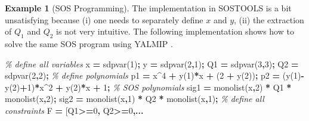 \documentclass[
]{book}
\newenvironment{Shaded}{\begin{snugshade}}{\end{snugshade}}
\newcommand{\CommentTok}[1]{\textcolor[rgb]{0.56,0.35,0.01}{\textit{#1}}}
\newcommand{\FloatTok}[1]{\textcolor[rgb]{0.00,0.00,0.81}{#1}}
\newcommand{\NormalTok}[1]{#1}
\newcommand{\OperatorTok}[1]{\textcolor[rgb]{0.81,0.36,0.00}{\textbf{#1}}}
\newcommand{\VariableTok}[1]{\textcolor[rgb]{0.00,0.00,0.00}{#1}}
\theoremstyle{definition}
\theoremstyle{definition}
\newtheorem{example}{Example}[chapter]
\theoremstyle{definition}
\theoremstyle{definition}
\theoremstyle{remark}
\begin{document}
\begin{example}[SOS Programming]
The implementation in SOSTOOLS is a bit unsatisfying because (i) one needs to separately define \(x\) and \(y\), (ii) the extraction of \(Q_1\) and \(Q_2\) is not very intuitive. The following implementation shows how to solve the same SOS program using YALMIP \citep{lofberg04icra-yalmip}.

\begin{Shaded}
\begin{Highlighting}[]
\CommentTok{\% define all variables}
\VariableTok{x} \OperatorTok{=} \VariableTok{sdpvar}\NormalTok{(}\FloatTok{1}\NormalTok{)}\OperatorTok{;}
\VariableTok{y} \OperatorTok{=} \VariableTok{sdpvar}\NormalTok{(}\FloatTok{2}\OperatorTok{,}\FloatTok{1}\NormalTok{)}\OperatorTok{;}
\VariableTok{Q1} \OperatorTok{=} \VariableTok{sdpvar}\NormalTok{(}\FloatTok{3}\OperatorTok{,}\FloatTok{3}\NormalTok{)}\OperatorTok{;}
\VariableTok{Q2} \OperatorTok{=} \VariableTok{sdpvar}\NormalTok{(}\FloatTok{2}\OperatorTok{,}\FloatTok{2}\NormalTok{)}\OperatorTok{;}
\CommentTok{\% define polynomials}
\VariableTok{p1} \OperatorTok{=} \VariableTok{x}\OperatorTok{\^{}}\FloatTok{4} \OperatorTok{+} \VariableTok{y}\NormalTok{(}\FloatTok{1}\NormalTok{)}\OperatorTok{*}\VariableTok{x} \OperatorTok{+}\NormalTok{ (}\FloatTok{2} \OperatorTok{+} \VariableTok{y}\NormalTok{(}\FloatTok{2}\NormalTok{))}\OperatorTok{;}
\VariableTok{p2} \OperatorTok{=}\NormalTok{ (}\VariableTok{y}\NormalTok{(}\FloatTok{1}\NormalTok{)}\OperatorTok{{-}}\VariableTok{y}\NormalTok{(}\FloatTok{2}\NormalTok{)}\OperatorTok{+}\FloatTok{1}\NormalTok{)}\OperatorTok{*}\VariableTok{x}\OperatorTok{\^{}}\FloatTok{2} \OperatorTok{+} \VariableTok{y}\NormalTok{(}\FloatTok{2}\NormalTok{)}\OperatorTok{*}\VariableTok{x} \OperatorTok{+} \FloatTok{1}\OperatorTok{;}
\CommentTok{\% SOS polynomials}
\VariableTok{sig1} \OperatorTok{=} \VariableTok{monolist}\NormalTok{(}\VariableTok{x}\OperatorTok{,}\FloatTok{2}\NormalTok{)}\OperatorTok{\textquotesingle{}} \OperatorTok{*} \VariableTok{Q1} \OperatorTok{*} \VariableTok{monolist}\NormalTok{(}\VariableTok{x}\OperatorTok{,}\FloatTok{2}\NormalTok{)}\OperatorTok{;}
\VariableTok{sig2} \OperatorTok{=} \VariableTok{monolist}\NormalTok{(}\VariableTok{x}\OperatorTok{,}\FloatTok{1}\NormalTok{)}\OperatorTok{\textquotesingle{}} \OperatorTok{*} \VariableTok{Q2} \OperatorTok{*} \VariableTok{monolist}\NormalTok{(}\VariableTok{x}\OperatorTok{,}\FloatTok{1}\NormalTok{)}\OperatorTok{;}
\CommentTok{\% define all constraints}
\VariableTok{F} \OperatorTok{=}\NormalTok{ [}\VariableTok{Q1}\OperatorTok{\textgreater{}=}\FloatTok{0}\OperatorTok{,} \VariableTok{Q2}\OperatorTok{\textgreater{}=}\FloatTok{0}\OperatorTok{,...}

\end{Highlighting}
\end{Shaded}
\end{example}
\end{document}
